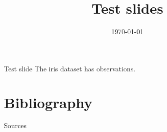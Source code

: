 \documentclass[table,british,aspectratio=169]{beamer}
\title{Test slides}
\subtitle{}
\author{}
\institute{}
\date{\today}
\begin{document}
\begin{frame}
    \titlepage
\end{frame}


\begin{frame}{Test slide}
  The iris dataset has  observations.
\end{frame}


\appendix
\begingroup

\section{Bibliography}
\begin{frame}[allowframebreaks]{Sources}
  \printbibliography[heading=none]
\end{frame}
\end{document}
